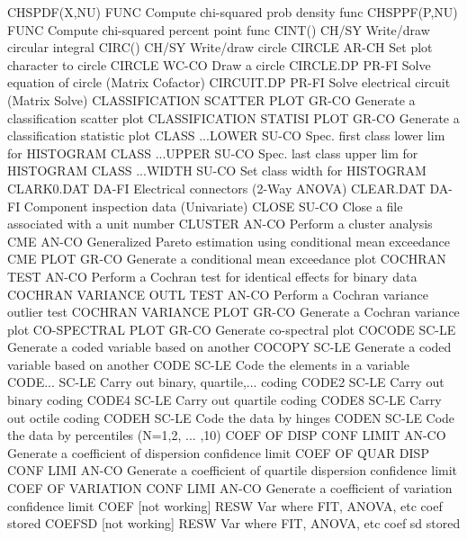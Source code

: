 CHSPDF(X,NU)                FUNC  Compute chi-squared prob density func
CHSPPF(P,NU)                FUNC  Compute chi-squared percent point func
CINT()                      CH/SY Write/draw circular integral
CIRC()                      CH/SY Write/draw circle
CIRCLE                      AR-CH Set plot character to circle
CIRCLE                      WC-CO Draw a circle
CIRCLE.DP                   PR-FI Solve equation of circle (Matrix Cofactor)
CIRCUIT.DP                  PR-FI Solve electrical circuit (Matrix Solve)
CLASSIFICATION SCATTER PLOT GR-CO Generate a classification scatter plot
CLASSIFICATION STATISI PLOT GR-CO Generate a classification statistic plot
CLASS ...LOWER              SU-CO Spec. first class lower lim for HISTOGRAM
CLASS ...UPPER              SU-CO Spec. last class upper lim for HISTOGRAM
CLASS ...WIDTH              SU-CO Set class width for HISTOGRAM
CLARK0.DAT                  DA-FI Electrical connectors (2-Way ANOVA)
CLEAR.DAT                   DA-FI Component inspection data (Univariate)
CLOSE                       SU-CO Close a file associated with a unit number
CLUSTER                     AN-CO Perform a cluster analysis
CME                         AN-CO Generalized Pareto estimation using conditional mean exceedance
CME PLOT                    GR-CO Generate a conditional mean exceedance plot
COCHRAN TEST                AN-CO Perform a Cochran test for identical effects for binary data
COCHRAN VARIANCE OUTL TEST  AN-CO Perform a Cochran variance outlier test
COCHRAN VARIANCE PLOT       GR-CO Generate a Cochran variance plot
CO-SPECTRAL PLOT            GR-CO Generate co-spectral plot
COCODE                      SC-LE Generate a coded variable based on another
COCOPY                      SC-LE Generate a coded variable based on another
CODE                        SC-LE Code the elements in a variable
CODE...                     SC-LE Carry out binary, quartile,... coding
CODE2                       SC-LE Carry out binary coding
CODE4                       SC-LE Carry out quartile coding
CODE8                       SC-LE Carry out octile coding
CODEH                       SC-LE Code the data by hinges
CODEN                       SC-LE Code the data by percentiles (N=1,2, ... ,10)
COEF OF DISP CONF LIMIT     AN-CO Generate a coefficient of dispersion confidence limit
COEF OF QUAR DISP CONF LIMI AN-CO Generate a coefficient of quartile dispersion confidence limit
COEF OF VARIATION CONF LIMI AN-CO Generate a coefficient of variation confidence limit
COEF [not working]          RESW  Var where FIT, ANOVA, etc coef stored
COEFSD [not working]        RESW  Var where FIT, ANOVA, etc coef sd stored
